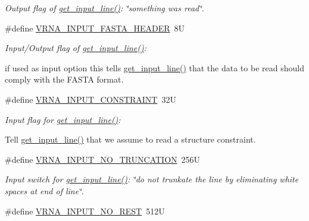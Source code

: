\begin{DoxyCompactItemize}
\begin{DoxyCompactList}\small\item\em Output flag of \hyperlink{group__utils_ga8ef1835eb83f542396f59f0b205965e5}{get\-\_\-input\-\_\-line()}\-: {\itshape \char`\"{}something was read\char`\"{}}. \end{DoxyCompactList}\item 
\#define \hyperlink{group__utils_ga2f0d8069e93d3ac54d9320d6bdb8e7e7}{V\-R\-N\-A\-\_\-\-I\-N\-P\-U\-T\-\_\-\-F\-A\-S\-T\-A\-\_\-\-H\-E\-A\-D\-E\-R}~8\-U
\begin{DoxyCompactList}\small\item\em Input/\-Output flag of \hyperlink{group__utils_ga8ef1835eb83f542396f59f0b205965e5}{get\-\_\-input\-\_\-line()}\-:\par
if used as input option this tells \hyperlink{group__utils_ga8ef1835eb83f542396f59f0b205965e5}{get\-\_\-input\-\_\-line()} that the data to be read should comply with the F\-A\-S\-T\-A format. \end{DoxyCompactList}\item 
\#define \hyperlink{group__utils_gac08a9df45b9721b97a47dbfe7a6e5f85}{V\-R\-N\-A\-\_\-\-I\-N\-P\-U\-T\-\_\-\-C\-O\-N\-S\-T\-R\-A\-I\-N\-T}~32\-U
\begin{DoxyCompactList}\small\item\em Input flag for \hyperlink{group__utils_ga8ef1835eb83f542396f59f0b205965e5}{get\-\_\-input\-\_\-line()}\-:\par
Tell \hyperlink{group__utils_ga8ef1835eb83f542396f59f0b205965e5}{get\-\_\-input\-\_\-line()} that we assume to read a structure constraint. \end{DoxyCompactList}\item 
\hypertarget{group__utils_ga086742158293217a46ae2f71bb296937}{\#define \hyperlink{group__utils_ga086742158293217a46ae2f71bb296937}{V\-R\-N\-A\-\_\-\-I\-N\-P\-U\-T\-\_\-\-N\-O\-\_\-\-T\-R\-U\-N\-C\-A\-T\-I\-O\-N}~256\-U}\label{group__utils_ga086742158293217a46ae2f71bb296937}

\begin{DoxyCompactList}\small\item\em Input switch for \hyperlink{group__utils_ga8ef1835eb83f542396f59f0b205965e5}{get\-\_\-input\-\_\-line()}\-: {\itshape \char`\"{}do not trunkate the line by eliminating white spaces at end of line\char`\"{}}. \end{DoxyCompactList}\item 
\hypertarget{group__utils_ga7a2e8c50a0c7ce82e60da1016e1367fd}{\#define \hyperlink{group__utils_ga7a2e8c50a0c7ce82e60da1016e1367fd}{V\-R\-N\-A\-\_\-\-I\-N\-P\-U\-T\-\_\-\-N\-O\-\_\-\-R\-E\-S\-T}~512\-U}\label{group__utils_ga7a2e8c50a0c7ce82e60da1016e1367fd}


\end{DoxyCompactItemize}
